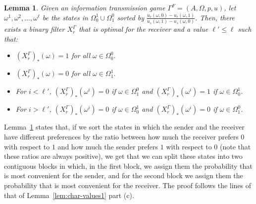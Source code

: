 \documentclass[submission,copyright,creativecommons]{eptcs}
\newtheorem{lemma}{Lemma}
\begin{document}
\begin{lemma}\label{lem:char-values2}
Given an information transmission game $\Gamma^{F} = (A, \Omega, p, u)$, let $\omega^1, \omega^2, \ldots, \omega^{\ell}$ be the states in $\Omega_0^1 \cup \Omega^0_1$ sorted by $\frac{u_r(\omega, 0) - u_r(\omega, 1)}{u_s(\omega, 1) - u_s(\omega, 0)}$. Then, there exists a binary filter $X_r^\Gamma$ that is optimal for the receiver and a value $\ell' \le \ell$ such that:
\begin{itemize}
\item[(a)] $(X_r^\Gamma)_*(\omega) = 1$ for all $\omega \in \Omega_0^0$.
\item[(b)] $(X_r^\Gamma)_*(\omega) = 0$ for all $\omega \in \Omega_1^1$.
\item[(c)] For $i < \ell'$, $(X_r^\Gamma)_*(\omega^i) =  0$ if $\omega \in \Omega_1^0$ and $(X_r^\Gamma)_*(\omega^i) =  1$ if $\omega \in \Omega_0^1$.
\item[(d)] For $i > \ell'$, $(X_r^\Gamma)_*(\omega^i) =  0$ if $\omega \in \Omega_0^1$ and $(X_r^\Gamma)_*(\omega^i) =  0$ if $\omega \in \Omega_1^0$.
\end{itemize}
\end{lemma}


Lemma~\ref{lem:char-values2} states that, if we sort the states in which the  sender and the receiver have different preferences by the ratio between how much the receiver prefers $0$ with respect to $1$ and how much the sender prefers $1$ with respect to $0$ (note that these ratios are always positive), we get that we can split these states into two contiguous blocks in which, in the first block, we assign them the probability that is most convenient for the sender, and for the second block we assign them the probability that is most convenient for the receiver. The proof follows the lines of that of Lemma~\ref{lem:char-values1} part (c).
\end{document}
